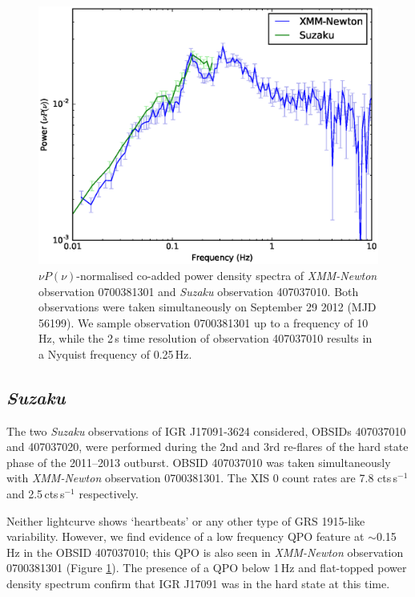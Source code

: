 \begin{figure}
    \includegraphics[width=0.9\columnwidth, trim = 0cm 0cm 0.5cm 1.0cm, clip]{images/multipower.eps}
    \captionsetup{singlelinecheck=off}
    \caption{$\nu P(\nu)$-normalised co-added power density spectra of \textit{XMM-Newton} observation 0700381301 and \textit{Suzaku} observation 407037010.  Both observations were taken simultaneously on September 29 2012 (MJD 56199).  We sample observation 0700381301 up to a frequency of 10\,Hz, while the 2\,s time resolution of observation 407037010 results in a Nyquist frequency of 0.25\,Hz.}
   \label{fig:xmmqpo}
\end{figure}

\subsection{\textit{Suzaku}}

\par The two {\it Suzaku} observations of IGR J17091-3624 considered, OBSIDs 407037010 and 407037020, were performed during the 2nd and 3rd re-flares of the hard state phase of the 2011--2013 outburst.  OBSID 407037010 was taken simultaneously with \textit{XMM-Newton} observation 0700381301.  The XIS 0 count rates are 7.8 cts\,s$^{-1}$ and 2.5\,cts\,s$^{-1}$ respectively.
\par Neither lightcurve shows `heartbeats' or any other type of GRS 1915-like variability.  However, we find evidence of a low frequency QPO feature at $\sim$0.15 Hz in the OBSID 407037010; this QPO is also seen in \textit{XMM-Newton} observation 0700381301 (Figure \ref{fig:xmmqpo}).  The presence of a QPO below 1\,Hz and flat-topped power density spectrum confirm that IGR J17091 was in the hard state at this time.

